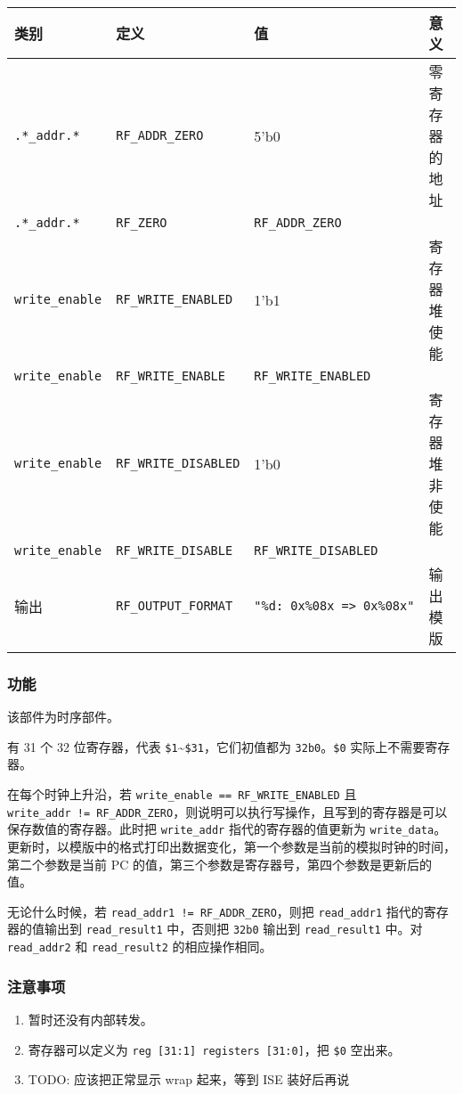 \begin{longtable}[]{@{}llll@{}}
\toprule
类别 & 定义 & 值 & 意义\tabularnewline
\midrule
\endhead
\texttt{.*\_addr.*} & \texttt{RF\_ADDR\_ZERO} & 5'b0 &
零寄存器的地址\tabularnewline
\texttt{.*\_addr.*} & \texttt{RF\_ZERO} & \texttt{RF\_ADDR\_ZERO}
&\tabularnewline
\texttt{write\_enable} & \texttt{RF\_WRITE\_ENABLED} & 1'b1 &
寄存器堆使能\tabularnewline
\texttt{write\_enable} & \texttt{RF\_WRITE\_ENABLE} &
\texttt{RF\_WRITE\_ENABLED} &\tabularnewline
\texttt{write\_enable} & \texttt{RF\_WRITE\_DISABLED} & 1'b0 &
寄存器堆非使能\tabularnewline
\texttt{write\_enable} & \texttt{RF\_WRITE\_DISABLE} &
\texttt{RF\_WRITE\_DISABLED} &\tabularnewline
输出 & \texttt{RF\_OUTPUT\_FORMAT} &
\texttt{"\%d:\ 0x\%08x\ =\textgreater{}\ 0x\%08x"} &
输出模版\tabularnewline
\bottomrule
\end{longtable}

\hypertarget{ux529fux80fd-4}{%
\subsubsection{功能}\label{ux529fux80fd-4}}

该部件为时序部件。

有 31 个 32 位寄存器，代表
\texttt{\$1}\textasciitilde{}\texttt{\$31}，它们初值都为
\texttt{32\textquotesingle{}b0}。\texttt{\$0} 实际上不需要寄存器。

在每个时钟上升沿，若 \texttt{write\_enable\ ==\ RF\_WRITE\_ENABLED} 且
\texttt{write\_addr\ !=\ RF\_ADDR\_ZERO}，则说明可以执行写操作，且写到的寄存器是可以保存数值的寄存器。此时把
\texttt{write\_addr} 指代的寄存器的值更新为
\texttt{write\_data}。更新时，以模版中的格式打印出数据变化，第一个参数是当前的模拟时钟的时间，第二个参数是当前
PC 的值，第三个参数是寄存器号，第四个参数是更新后的值。

无论什么时候，若 \texttt{read\_addr1\ !=\ RF\_ADDR\_ZERO}，则把
\texttt{read\_addr1} 指代的寄存器的值输出到 \texttt{read\_result1}
中，否则把 \texttt{32\textquotesingle{}b0} 输出到 \texttt{read\_result1}
中。对 \texttt{read\_addr2} 和 \texttt{read\_result2} 的相应操作相同。

\hypertarget{ux6ce8ux610fux4e8bux9879-3}{%
\subsubsection{注意事项}\label{ux6ce8ux610fux4e8bux9879-3}}

\begin{enumerate}
\def\labelenumi{\arabic{enumi}.}
\tightlist
\item
  暂时还没有内部转发。
\item
  寄存器可以定义为 \texttt{reg\ {[}31:1{]}\ registers\ {[}31:0{]}}，把
  \texttt{\$0} 空出来。
\item
  TODO: 应该把正常显示 wrap 起来，等到 ISE 装好后再说
\end{enumerate}

